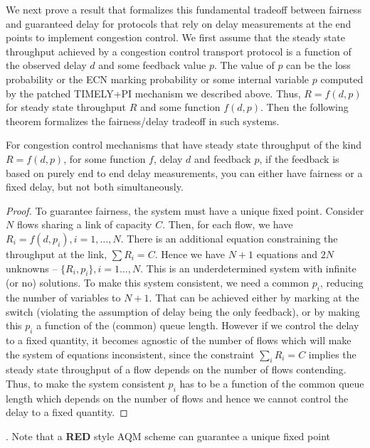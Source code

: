 We next prove a result that formalizes this fundamental tradeoff between fairness
and guaranteed  delay for protocols that rely on delay measurements at the end
points to implement congestion control. We first assume that the
steady state throughput achieved by a congestion control transport
protocol is a function of the observed delay $d$ and some feedback
value $p$. The value of $p$ can be the loss probability or the ECN marking
probability or some internal variable $p$ computed by the patched
TIMELY+PI mechanism we described above. Thus,
$R = f(d,p)$ for steady state throughput $R$ and some function $f(d,p)$. Then the
following theorem formalizes the fairness/delay tradeoff in such systems.
\begin{thm}
\label{thm:fairness-delay}
For congestion control mechanisms that have steady state throughput of
the kind $R = f(d,p)$, for some function $f$, delay $d$ and
feedback $p$, if the feedback is based on purely end to end
delay measurements, you can either have fairness or a fixed delay, 
but not both simultaneously.
\end{thm}
\begin{proof}
To guarantee fairness, the system must have a
unique fixed point. 
Consider $N$ flows sharing a link of capacity $C$. 
Then, for each flow, we have 
$ R_i = f(d,p_i), i = 1,\ldots,N.$
There is an additional equation constraining the throughput at the
link, $\sum R_i = C$.
Hence we have $N+1$ equations and $2 N$ unknowns -- $\{R_i,p_i\},
 i=1\ldots,N$. This is an underdetermined system with infinite (or no)
solutions. To make this system consistent, we need a common $p_i$,
reducing the number of variables to $N+1$. That can be achieved
either by marking at the switch (violating the assumption of delay
being the only feedback), or by making this $p_i$ a function of
the (common) queue length. However if we control the delay to a fixed quantity,
it becomes agnostic of the number of flows which will make the system
of equations inconsistent, since the constraint $\sum_i R_i = C$
implies the steady state throughput of a flow depends on the number of
flows contending. Thus, to make the system consistent $p_i$ has to be
a function of the common queue length which depends on the number of flows 
and hence we cannot control the delay to a fixed quantity. 
\end{proof}
\vspace{-0.5em}
. Note that a \textbf{RED} style AQM scheme can guarantee a unique fixed point
